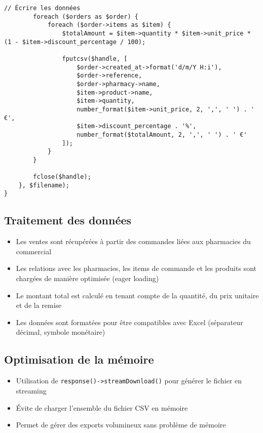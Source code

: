 \documentclass[12pt,a4paper]{article}
\begin{document}
\begin{lstlisting}[caption=Méthode exportCommercialSales]
        // Écrire les données
        foreach ($orders as $order) {
            foreach ($order->items as $item) {
                $totalAmount = $item->quantity * $item->unit_price * (1 - $item->discount_percentage / 100);
                
                fputcsv($handle, [
                    $order->created_at->format('d/m/Y H:i'),
                    $order->reference,
                    $order->pharmacy->name,
                    $item->product->name,
                    $item->quantity,
                    number_format($item->unit_price, 2, ',', ' ') . ' €',
                    $item->discount_percentage . '%',
                    number_format($totalAmount, 2, ',', ' ') . ' €'
                ]);
            }
        }
        
        fclose($handle);
    }, $filename);
}
\end{lstlisting}

\subsection{Traitement des données}
\begin{itemize}
    \item Les ventes sont récupérées à partir des commandes liées aux pharmacies du commercial
    \item Les relations avec les pharmacies, les items de commande et les produits sont chargées de manière optimisée (eager loading)
    \item Le montant total est calculé en tenant compte de la quantité, du prix unitaire et de la remise
    \item Les données sont formatées pour être compatibles avec Excel (séparateur décimal, symbole monétaire)
\end{itemize}

\subsection{Optimisation de la mémoire}
\begin{itemize}
    \item Utilisation de \texttt{response()->streamDownload()} pour générer le fichier en streaming
    \item Évite de charger l'ensemble du fichier CSV en mémoire
    \item Permet de gérer des exports volumineux sans problème de mémoire
\end{itemize}
\end{document}
